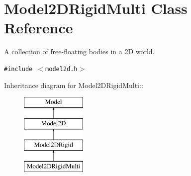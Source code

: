 \section{Model2DRigid\-Multi  Class Reference}
\label{classModel2DRigidMulti}
A collection of free-floating bodies in a 2D world. 


{\tt \#include $<$model2d.h$>$}

Inheritance diagram for Model2DRigid\-Multi::\begin{figure}[H]
\begin{center}
\leavevmode
\includegraphics[height=4cm]{classModel2DRigidMulti}
\end{center}
\end{figure}
